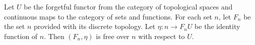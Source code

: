 Let $U$ be the forgetful functor from the category of topological spaces and continuous maps to the category of sets and functions. For each set $n$, let $F_n$ be the set $n$ provided with its discrete topology. Let $\eta: n \longrightarrow F_nU$ be the identity function of $n$. Then $(F_n, \eta)$ is free over $n$ with respect to $U$.
